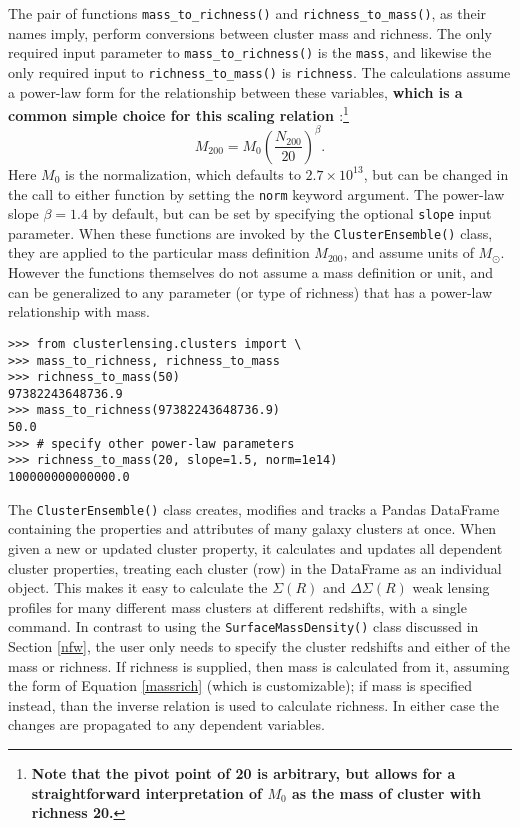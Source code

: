 \documentclass[twocolumn]{aastex6}
\newcommand{\code}{\lstinline[style=codeintext]}
\begin{document}
The pair of functions \code{mass_to_richness()} and \code{richness_to_mass()}, as their names imply, perform conversions between cluster mass and richness. The only required input parameter to \code{mass_to_richness()} is the \code{mass}, and likewise the only required input to \code{richness_to_mass()} is \code{richness}. The calculations assume a power-law form for the relationship between these variables, {\bf which is a common simple choice for this scaling relation \citep[e.g.][]{Johnston07, Mandelbaum08b, Andreon10}}:\footnote{\bf Note that the pivot point of 20 is arbitrary, but allows for a straightforward interpretation of $M_0$ as the mass of cluster with richness 20.}
\begin{equation}\label{massrich}
M_{200} = M_0 \left( \frac{N_{200}}{20} \right) ^ \beta.
\end{equation}
Here $M_0$ is the normalization, which defaults to $2.7 \times 10^{13}$, but can be changed in the call to either function by setting the \code{norm} keyword argument. The power-law slope $\beta = 1.4$ by default, but can be set by specifying the optional \code{slope} input parameter. When these functions are invoked by the \code{ClusterEnsemble()} class, they are applied to the particular mass definition $M_{200}$, and assume units of $M_{\odot}$. However the functions themselves do not assume a mass definition or unit, and can be generalized to any parameter (or type of richness) that has a power-law relationship with mass.

\begin{verbatim}
>>> from clusterlensing.clusters import \
>>> mass_to_richness, richness_to_mass
>>> richness_to_mass(50)
97382243648736.9
>>> mass_to_richness(97382243648736.9)
50.0
>>> # specify other power-law parameters
>>> richness_to_mass(20, slope=1.5, norm=1e14)
100000000000000.0
\end{verbatim}

The \code{ClusterEnsemble()} class creates, modifies and tracks a Pandas DataFrame containing the properties and attributes of many galaxy clusters at once. When given a new or updated cluster property, it calculates and updates all dependent cluster properties, treating each cluster (row) in the DataFrame as an individual object. This makes it easy to calculate the $\Sigma(R)$ and $\Delta\Sigma(R)$ weak lensing profiles for many different mass clusters at different redshifts, with a single command. In contrast to using the \code{SurfaceMassDensity()} class discussed in Section \ref{nfw}, the user only needs to specify the cluster redshifts and either of the mass or richness. If richness is supplied, then mass is calculated from it, assuming the form of Equation \ref{massrich} (which is customizable); if mass is specified instead, than the inverse relation is used to calculate richness. In either case the changes are propagated to any dependent variables.
\end{document}
